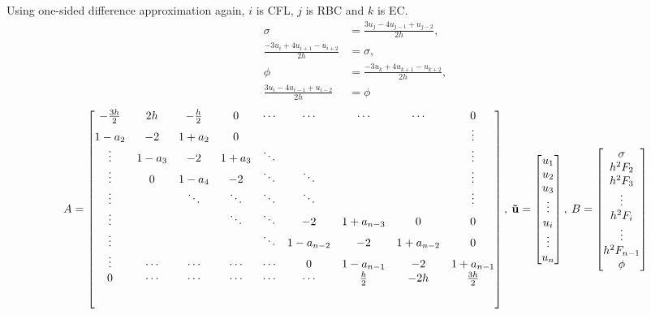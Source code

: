 \documentclass[8pt, a4paper]{article}
\begin{document}
  Using one-sided difference approximation again, $i$ is CFL, $j$ is RBC and 
  $k$ is EC.
  \begin{align*}
  \sigma&=\frac{3u_j-4u_{j-1}+u_{j-2}}{2h},\\
  \frac{-3u_i+4u_{i+1}-u_{i+2}}{2h}&=\sigma,\\
  \phi&=\frac{-3u_k+4u_{k+1}-u_{k+2}}{2h},\\
  \frac{3u_i-4u_{i-1}+u_{i-2}}{2h}&=\phi
  \end{align*}
  \begin{equation}
  A=
  \begin{bmatrix}
  -\frac{3h}{2} & 2h & -\frac{h}{2} & 0 & \cdots & \cdots & \cdots & \cdots & 
  0\\
  1-a_2 & -2 & 1+a_2 & 0 & & & & & \vdots\\
  \vdots & 1-a_3 & -2 & 1+a_3 & \ddots & & & & \vdots\\
  \vdots & 0 & 1-a_4 & -2 & \ddots & \ddots & &  & \vdots\\
  \vdots & & \ddots & \ddots & \ddots & \ddots & & & \vdots\\
  \vdots & & & \ddots & \ddots & -2 & 1+a_{n-3} & 0 & 0\\
  \vdots & & & & \ddots & 1-a_{n-2} & -2 & 1+a_{n-2} & 0\\
  \vdots & \cdots & \cdots & \cdots & \cdots & 0 & 1-a_{n-1} & -2 & 1+a_{n-1}\\
  0 & \cdots & \cdots & \cdots & \cdots & \cdots & \frac{h}{2} & -2h & 
  \frac{3h}{2}\\[5ex]
  \end{bmatrix},\:
  \mathbf{\vec{u}}=
  \begin{bmatrix}
  u_1\\
  u_2\\
  u_3\\
  \vdots\\
  u_i\\
  \vdots\\
  u_n
  \end{bmatrix},\:
  B=
  \begin{bmatrix}
  \sigma\\
  h^2F_2\\
  h^2F_3\\
  \vdots\\
  h^2F_i\\
  \vdots\\
  h^2F_{n-1}\\
  \phi
  \end{bmatrix}
  \end{equation}
  
\end{document}
